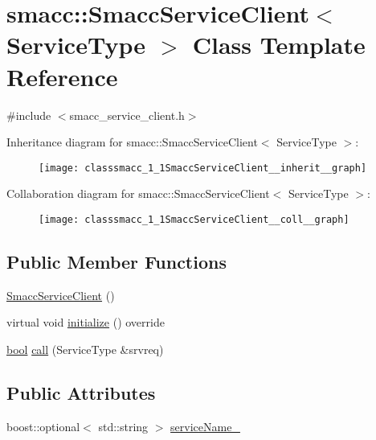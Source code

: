 \hypertarget{classsmacc_1_1SmaccServiceClient}{}\section{smacc\+:\+:Smacc\+Service\+Client$<$ Service\+Type $>$ Class Template Reference}
\label{classsmacc_1_1SmaccServiceClient}


{\ttfamily \#include $<$smacc\+\_\+service\+\_\+client.\+h$>$}



Inheritance diagram for smacc\+:\+:Smacc\+Service\+Client$<$ Service\+Type $>$\+:
\nopagebreak
\begin{figure}[H]
\begin{center}
\leavevmode
\texttt{[image: classsmacc\_1\_1SmaccServiceClient\_\_inherit\_\_graph]}
\end{center}
\end{figure}


Collaboration diagram for smacc\+:\+:Smacc\+Service\+Client$<$ Service\+Type $>$\+:
\nopagebreak
\begin{figure}[H]
\begin{center}
\leavevmode
\texttt{[image: classsmacc\_1\_1SmaccServiceClient\_\_coll\_\_graph]}
\end{center}
\end{figure}
\subsection*{Public Member Functions}
\begin{DoxyCompactItemize}
\item 
\hyperlink{classsmacc_1_1SmaccServiceClient_a54f6b9cd746c3e6c604afa1c93b990fd}{Smacc\+Service\+Client} ()
\item 
virtual void \hyperlink{classsmacc_1_1SmaccServiceClient_a9ac26f1ca1e661e6b393ce7605166bdc}{initialize} () override
\item 
\hyperlink{classbool}{bool} \hyperlink{classsmacc_1_1SmaccServiceClient_a1b749ce13f3cb1dbf10a5992c05c173e}{call} (Service\+Type \&srvreq)
\end{DoxyCompactItemize}
\subsection*{Public Attributes}
\begin{DoxyCompactItemize}
\item 
boost\+::optional$<$ std\+::string $>$ \hyperlink{classsmacc_1_1SmaccServiceClient_a93cf1653e9d7a0f4aa25dbb8ae7d07fc}{service\+Name\+\_\+}
\end{DoxyCompactItemize}
